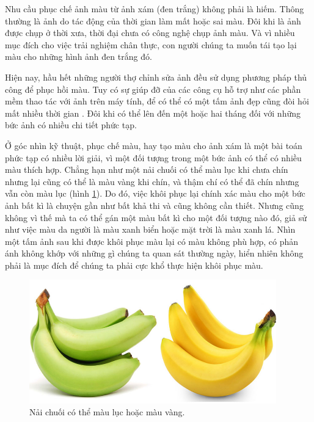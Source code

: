 \documentclass[a4paper, 12pt]{report}
\begin{document}
Nhu cầu phục chế ảnh màu từ ảnh xám (đen trắng) không phải là hiếm.
Thông thường là ảnh do tác động của thời gian làm mất hoặc sai màu.
Đôi khi là ảnh được chụp ở thời xưa, thời đại chưa có công nghệ chụp ảnh màu.
Và vì nhiều mục đích cho việc trải nghiệm chân thực, con người chúng ta muốn tái tạo lại màu cho những hình ảnh đen trắng đó.\vspace{5pt}

Hiện nay, hầu hết những người thợ chỉnh sửa ảnh đều sử dụng phương pháp thủ công để phục hồi màu.
Tuy có sự giúp đỡ của các công cụ hỗ trợ như các phần mềm thao tác với ảnh trên máy tính, để có thể có một tấm ảnh đẹp cũng đòi hỏi mất nhiều thời gian \cite{replytime2colorize2012}.
Đôi khi có thể lên đến một hoặc hai tháng đối với những bức ảnh có nhiều chi tiết phức tạp.\vspace{5pt}

Ở góc nhìn kỹ thuật, phục chế màu, hay tạo màu cho ảnh xám là một bài toán phức tạp có nhiều lời giải, vì một đối tượng trong một bức ảnh có thể có nhiều màu thích hợp.
Chẳng hạn như một nải chuối có thể màu lục khi chưa chín nhưng lại cũng có thể là màu vàng khi chín, và thậm chí có thể đã chín nhưng vẫn còn màu lục (hình \ref{fig:banana}).
Do đó, việc khôi phục lại chính xác màu cho một bức ảnh bất kì là chuyện gần như bất khả thi và cũng không cần thiết.
Nhưng cũng không vì thế mà ta có thể gán một màu bất kì cho một đối tượng nào đó, giả sử như việc màu da người là màu xanh biển hoặc mặt trời là màu xanh lá.
Nhìn một tấm ảnh sau khi được khôi phục màu lại có màu không phù hợp, có phản ánh không khớp với những gì chúng ta quan sát thường ngày, hiển nhiên không phải là mục đích để chúng ta phải cực khổ thực hiện khôi phục màu.\vspace{5pt}

\begin{figure}
\includegraphics[width=10.7cm]{images/1_1.jpg} 
\caption{Nải chuối có thể màu lục hoặc màu vàng.}
\label{fig:banana}
\end{figure}
\end{document}
